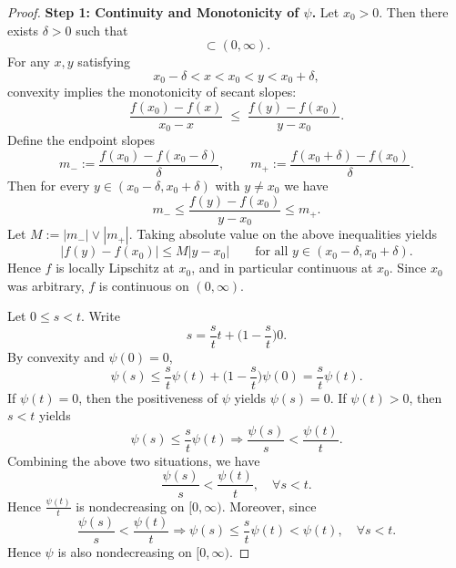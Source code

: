 \documentclass[12pt]{article}
\renewcommand{\(}{\left(}%
\renewcommand{\)}{\right)}%
\renewcommand{\[}{\left[}%
\renewcommand{\]}{\right]}%
\newtheorem{proof}{Proof.}}
\begin{document}
\begin{proof}
\textbf{Step 1: Continuity and Monotonicity of $\psi$.}
Let $x_0>0$. Then there exists $\delta>0$ such that
\begin{equation*}
[x_0-\delta,x_0+\delta]\subset (0,\infty).
\end{equation*}
For any $x,y$ satisfying
\begin{equation*}
x_0-\delta < x < x_0 < y < x_0+\delta,
\end{equation*}
convexity implies the monotonicity of secant slopes:
\begin{equation*}
\frac{f(x_0)-f(x)}{x_0-x}
\;\le\;
\frac{f(y)-f(x_0)}{y-x_0}.
\end{equation*}
Define the endpoint slopes
\begin{equation*}
m_- := \frac{f(x_0)-f(x_0-\delta)}{\delta},
\qquad
m_+ := \frac{f(x_0+\delta)-f(x_0)}{\delta}.
\end{equation*}
Then for every $y\in(x_0-\delta,x_0+\delta)$ with $y\neq x_0$ we have
\begin{equation*}
m_- \le \frac{f(y)-f(x_0)}{y-x_0} \le m_+.
\end{equation*}
Let $M:=|m_-|\vee |m_+|$. Taking absolute value on the above inequalities yields
\begin{equation*}
|f(y)-f(x_0)| \le M|y-x_0| \qquad \text{for all } y\in(x_0-\delta,x_0+\delta).
\end{equation*}
Hence $f$ is locally Lipschitz at $x_0$, and in particular continuous at $x_0$.
Since $x_0$ was arbitrary, $f$ is continuous on $(0,\infty)$.

Let $0\le s<t$. Write
\begin{equation*}
s = \frac{s}{t} t + \Big(1-\frac{s}{t}\Big) 0.
\end{equation*}
By convexity and $\psi(0)=0$,
\begin{equation*}
\psi(s)
\le \frac{s}{t} \psi(t) + \Big(1-\frac{s}{t}\Big) \psi(0)= 
\frac{s}{t}\psi(t).
\end{equation*}
If $\psi(t)=0$, then the positiveness of $\psi$ yields $\psi(s)=0$.
If $\psi(t)>0$, then $s<t$ yields
\begin{equation*}
	\psi(s)\leq \frac{s}{t}\psi(t)\Longrightarrow \frac{\psi(s)}{s}<\frac{\psi(t)}{t}.
\end{equation*}
Combining the above two situations, we have 
\begin{equation*}
\frac{\psi(s)}{s}<\frac{\psi(t)}{t}, \quad\forall s<t.
\end{equation*}
Hence $\frac{\psi(t)}{t}$ is nondecreasing on $[0,\infty)$. Moreover, since
\begin{equation}
    \frac{\psi(s)}{s}<\frac{\psi(t)}{t}\Longrightarrow \psi(s)\leq \frac{s}{t}\psi(t)<\psi(t),\quad \forall s<t.
\end{equation}
Hence $\psi$ is also nondecreasing on $[0,\infty)$.


\end{proof}
\end{document}
